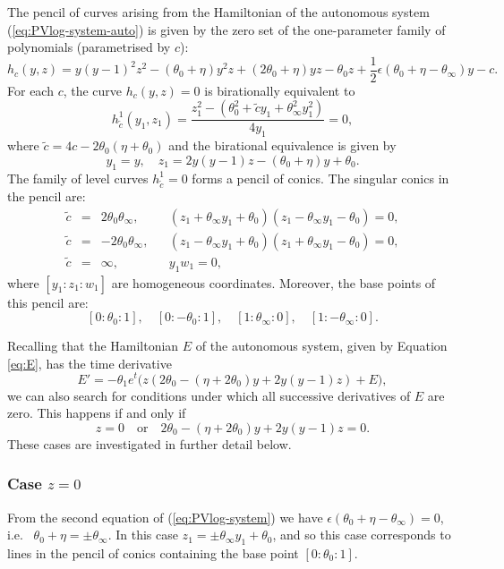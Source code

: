 

The pencil of curves arising from the Hamiltonian  of the autonomous system (\ref{eq:PVlog-system-auto}) is given by the zero set of the one-parameter family of polynomials (parametrised by $c$):
\begin{equation}\label{eq:pencil}
h_c(y,z)=y(y-1)^2z^2-(\theta_0+\eta)y^2z+(2\theta_0+\eta)yz-\theta_0z+\frac12\epsilon(\theta_0+\eta-\theta_{\infty})y-c.
\end{equation}
For each $c$, the curve $h_c(y,z)=0$ is birationally equivalent to
$$
h_{\tilde c}^1(y_1,z_1)=\frac{z_1^2-\left( \theta_0^2 +\tilde{c} y_1  + \theta_{\infty}^2  y_1^2 \right)}{4y_1}=0,
$$
where $\tilde{c}=4c-2\theta_0(\eta+\theta_0)$ and the birational equivalence is given by
$$
y_1=y,
\quad
z_1=2y(y-1)z-(\theta_0+\eta)y+\theta_0.
$$
The family of level curves $h_{\tilde c}^1=0$ forms a pencil of conics.
The singular conics in the pencil are:
\begin{align*}
\tilde{c}&=&2\theta_0\theta_{\infty},
&&(z_1+\theta_{\infty} y_1+\theta_0)(z_1-\theta_{\infty}y_1-\theta_0)=0,
\\
\tilde{c}&=&-2\theta_0\theta_{\infty},
&&(z_1-\theta_{\infty} y_1+\theta_0)(z_1+\theta_{\infty}y_1-\theta_0)=0,
\\
\tilde{c}&=&\infty,
&&
y_1w_1=0,
\end{align*}
where $[y_1:z_1:w_1]$ are homogeneous coordinates.
Moreover, the base points of this pencil are:
$$
[0:\theta_0:1],
\quad
[0:-\theta_0:1],
\quad
[1:\theta_{\infty}:0],
\quad
[1:-\theta_{\infty}:0].
$$

Recalling that the Hamiltonian $E$ of the autonomous system, given by Equation \eqref{eq:E}, has the time derivative 
$$
E'=-\theta_1 e^t\big( z(2\theta_0-(\eta+2\theta_0)y+2y(y-1)z ) +E\big),
$$
we can also search for conditions under which all successive derivatives of $E$ are zero. This happens if and only if
$$
z=0
\quad\text{or}\quad
2\theta_0-(\eta+2\theta_0)y+2y(y-1)z =0.
$$
These cases are investigated in further detail below.

\subsubsection*{Case $z=0$}
From the second equation of (\ref{eq:PVlog-system}) we have $\epsilon(\theta_0+\eta-\theta_{\infty})=0$, i.e.~ $\theta_0+\eta=\pm\theta_{\infty}$.
In this case $z_1=\pm\theta_{\infty}y_1+\theta_0$, and so this case corresponds to lines in the pencil of conics containing the base point $[0:\theta_0:1]$.

